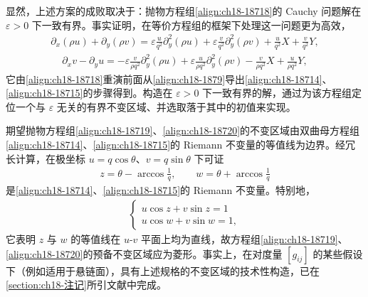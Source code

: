 \documentclass[../../main.tex]{subfiles}
\begin{document}
显然，上述方案的成败取决于：抛物方程组\eqref{align:ch18-18718}的 Cauchy 问题解在 $\varepsilon>0$ 下一致有界。事实证明，在等价方程组的框架下处理这一问题更为高效，
\begin{align}
\partial_x(\rho u)+\partial_y(\rho v)=\varepsilon\frac{u}{q^2}\partial_y^2(\rho u)+\varepsilon\frac{v}{q^2}\partial_y^2(\rho v)+\frac{u}{q^2}X+\frac{v}{q^2}Y,
\label{align:ch18-18719}
\end{align}
\begin{align}
\partial_xv-\partial_yu=-\varepsilon\frac{v}{\rho q^2}\partial_y^2(\rho u)+\varepsilon\frac{u}{\rho q^2}\partial_y^2(\rho v)-\frac{v}{\rho q^2}X+\frac{u}{\rho q^2}Y,
\label{align:ch18-18720}
\end{align}
它由\eqref{align:ch18-18718}重演前面从\eqref{align:ch18-1879}导出\eqref{align:ch18-18714}、\eqref{align:ch18-18715}的步骤得到。构造在 $\varepsilon>0$ 下一致有界的解，通过为该方程组定位一个与 $\varepsilon$ 无关的有界不变区域、并选取落于其中的初值来实现。

期望抛物方程组\eqref{align:ch18-18719}、\eqref{align:ch18-18720}的不变区域由双曲母方程组\eqref{align:ch18-18714}、\eqref{align:ch18-18715}的 Riemann 不变量的等值线为边界。经冗长计算，在极坐标 $u=q\cos\theta$、$v=q\sin\theta$ 下可证
\begin{align}
z=\theta-\arccos\frac1q,\qquad w=\theta+\arccos\frac1q
\label{align:ch18-18721}
\end{align}
是\eqref{align:ch18-18714}、\eqref{align:ch18-18715}的 Riemann 不变量。特别地，
\begin{align}
\begin{cases}
u\cos z+v\sin z=1\\
u\cos w+v\sin w=1,
\end{cases}
\label{align:ch18-18722}
\end{align}
它表明 $z$ 与 $w$ 的等值线在 $u$-$v$ 平面上均为直线，故方程组\eqref{align:ch18-18719}、\eqref{align:ch18-18720}的预备不变区域应为菱形。事实上，在对度量 $[g_{ij}]$ 的某些假设下（例如适用于悬链面），具有上述规格的不变区域的技术性构造，已在\cref{section:ch18-注记}所引文献中完成。
\end{document}
